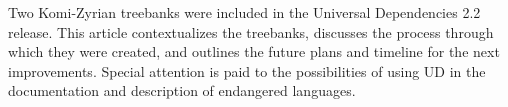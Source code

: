 Two Komi-Zyrian treebanks were included in the Universal Dependencies 2.2 release. This article contextualizes the treebanks, discusses the process through which they were created, and outlines the future plans and timeline for the next improvements. Special attention is paid to the possibilities of using UD in the documentation and description of endangered languages.
